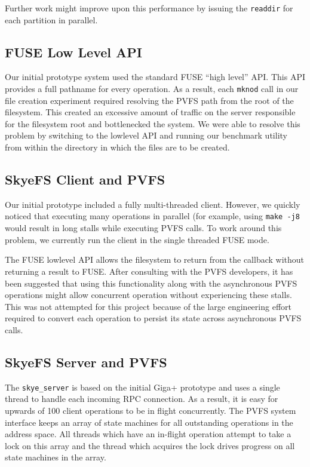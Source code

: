 \documentclass[twocolumn,letterpaper]{article}
\newcommand{\code}[1]{\texttt{#1}}
\begin{document}
Further work might improve upon this performance by issuing the \code{readdir}
for each partition in parallel.

\subsection{FUSE Low Level API}
Our initial prototype system used the standard FUSE ``high level'' API.  This
API provides a full pathname for every operation.  As a result, each
\code{mknod} call in our file creation experiment required resolving the PVFS
path from the root of the filesystem.  This created an excessive amount of
traffic on the server responsible for the filesystem root and bottlenecked the
system.  We were able to resolve this problem by switching to the lowlevel API
and running our benchmark utility from within the directory in which the files
are to be created.

\subsection{SkyeFS Client and PVFS}
Our initial prototype included a fully multi-threaded client.  However, we
quickly noticed that executing many operations in parallel (for example,
using \code{make -j8} would result in long stalls while executing PVFS calls.
To work around this problem, we currently run the client in the single
threaded FUSE mode.

The FUSE lowlevel API allows the filesystem to return from the callback
without returning a result to FUSE.  After consulting with the PVFS
developers, it has been suggested that using this functionality along with the
asynchronous PVFS operations might allow concurrent operation without
experiencing these stalls.  This was not attempted for this project because of
the large engineering effort required to convert each operation to persist its
state across asynchronous PVFS calls.

\subsection{SkyeFS Server and PVFS}
The \code{skye\_server} is based on the initial Giga+ prototype and uses a
single thread to handle each incoming RPC connection.  As a result, it is easy
for upwards of 100 client operations to be in flight concurrently.  The PVFS
system interface keeps an array of state machines for all outstanding
operations in the address space.  All threads which have an in-flight
operation attempt to take a lock on this array and the thread which acquires
the lock drives progress on all state machines in the array.
\end{document}
